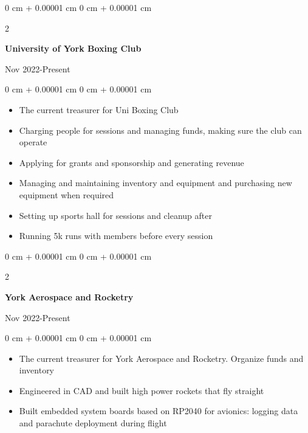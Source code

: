 \documentclass[10pt, letterpaper]{article}
\newenvironment{onecolentry}{
    \begin{adjustwidth}{
        0 cm + 0.00001 cm
    }{
        0 cm + 0.00001 cm
    }
}{
    \end{adjustwidth}
} %
\newenvironment{twocolentry}[2][]{
    \onecolentry
    \def\secondColumn{#2}
    \setcolumnwidth{\fill, 4.5 cm}
    \begin{paracol}{2}
}{
    \switchcolumn \raggedleft \secondColumn
    \end{paracol}
    \endonecolentry
} %
\begin{document}
        \begin{samepage}
            \begin{twocolentry}{
                Nov 2022-Present
            }
                \textbf{University of York Boxing Club}

                \vspace{0.10 cm}
            \end{twocolentry}


            \vspace{0.10 cm}

            \begin{onecolentry}
                \begin{itemize}
                    \item The current treasurer for Uni Boxing Club
                    \item Charging people for sessions and managing funds, making sure the club can operate
                    \item Applying for grants and sponsorship and generating revenue
                    \item Managing and maintaining inventory and equipment and purchasing new equipment when required
                    \item Setting up sports hall for sessions and cleanup after
                    \item Running 5k runs with members before every session
                \end{itemize}
            \end{onecolentry}

        \vspace{0.10 cm}

        
        \begin{samepage}
            \begin{twocolentry}{
                Nov 2022-Present
            }
                \textbf{York Aerospace and Rocketry}

                \vspace{0.10 cm}
            \end{twocolentry}


            \vspace{0.10 cm}

            \begin{onecolentry}
                \begin{itemize}
                    \item The current treasurer for York Aerospace and Rocketry. Organize funds and inventory
                    \item Engineered in CAD and built high power rockets that fly straight
                    \item Built embedded system boards based on RP2040 for avionics: logging data and parachute deployment during flight
                \end{itemize}
            \end{onecolentry}


\end{samepage}
\end{samepage}
\end{document}

